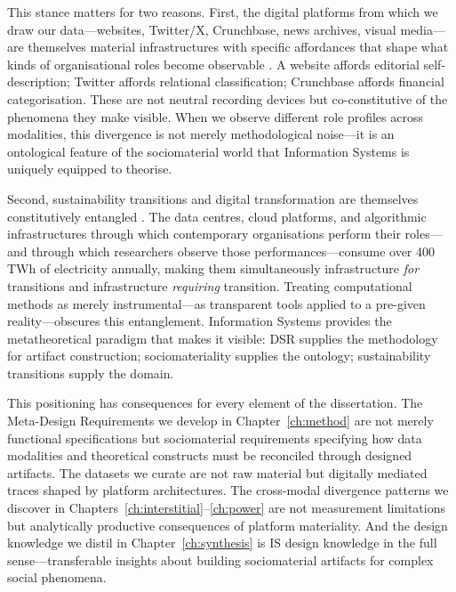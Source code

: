 \documentclass[../main.tex]{subfiles}
\begin{document}
This stance matters for two reasons. First, the digital platforms from which we draw our data---websites, Twitter/X, Crunchbase, news archives, visual media---are themselves material infrastructures with specific affordances that shape what kinds of organisational roles become observable \cite{leonardi2012materiality,kallinikos2013ambivalent}. A website affords editorial self-description; Twitter affords relational classification; Crunchbase affords financial categorisation. These are not neutral recording devices but co-constitutive of the phenomena they make visible. When we observe different role profiles across modalities, this divergence is not merely methodological noise---it is an ontological feature of the sociomaterial world that Information Systems is uniquely equipped to theorise.

Second, sustainability transitions and digital transformation are themselves constitutively entangled \cite{owoyele2025datacentering}. The data centres, cloud platforms, and algorithmic infrastructures through which contemporary organisations perform their roles---and through which researchers observe those performances---consume over 400 TWh of electricity annually, making them simultaneously infrastructure \emph{for} transitions and infrastructure \emph{requiring} transition. Treating computational methods as merely instrumental---as transparent tools applied to a pre-given reality---obscures this entanglement. Information Systems provides the metatheoretical paradigm that makes it visible: DSR supplies the methodology for artifact construction; sociomateriality supplies the ontology; sustainability transitions supply the domain.

This positioning has consequences for every element of the dissertation. The Meta-Design Requirements we develop in Chapter~\ref{ch:method} are not merely functional specifications but sociomaterial requirements specifying how data modalities and theoretical constructs must be reconciled through designed artifacts. The datasets we curate are not raw material but digitally mediated traces shaped by platform architectures. The cross-modal divergence patterns we discover in Chapters~\ref{ch:interstitial}--\ref{ch:power} are not measurement limitations but analytically productive consequences of platform materiality. And the design knowledge we distil in Chapter~\ref{ch:synthesis} is IS design knowledge in the full sense---transferable insights about building sociomaterial artifacts for complex social phenomena.
\end{document}

